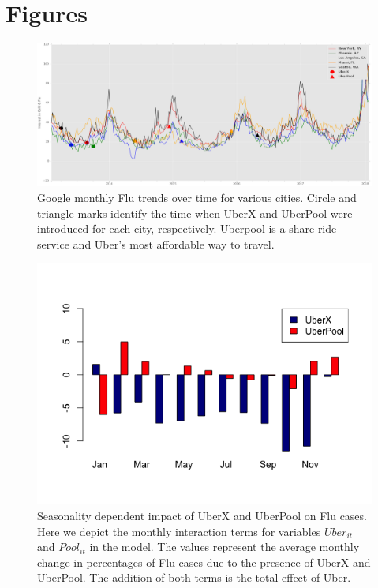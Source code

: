 \documentclass[a4paper,12pt]{article}
\begin{document}



\newpage
\section{Figures}

\begin{figure}[h!]
\centering
\includegraphics[width=15cm]{images/fig1}
\caption{Google monthly Flu trends over time for various cities. Circle and triangle marks identify the time when UberX and UberPool were introduced for each city, respectively. Uberpool is a share ride service and Uber's most affordable way to travel. }
\label{fig:Uber}
\end{figure}
\begin{figure}[h!]
\centering
\includegraphics[width=15cm]{images/Coefficients}
\caption{Seasonality dependent impact of UberX and UberPool on Flu cases. Here we depict the monthly interaction terms for variables $Uber_{it}$ and $ Pool_{it}$ in the model.  The values represent the average monthly change in percentages of Flu cases due to the presence of UberX and UberPool. The addition of both terms is the total effect of Uber.     }
\label{fig:interaction}
\end{figure}
\end{document}
